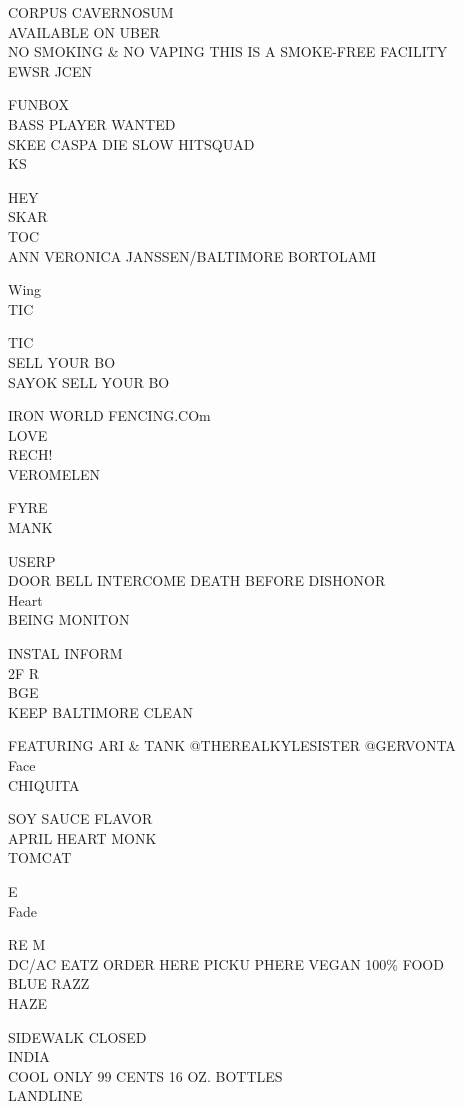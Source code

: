 \documentclass[10pt,letterpaper]{article}
\begin{document}
CORPUS CAVERNOSUM\\
AVAILABLE ON UBER\\
NO SMOKING \& NO VAPING THIS IS A SMOKE{-}FREE FACILITY\\
EWSR JCEN

FUNBOX\\
BASS PLAYER WANTED\\
SKEE CASPA DIE SLOW HITSQUAD\\
KS

HEY\\
SKAR\\
TOC\\
ANN VERONICA JANSSEN/BALTIMORE BORTOLAMI

Wing\\
TIC

TIC\\
SELL YOUR BO\\
SAYOK SELL YOUR BO

IRON WORLD FENCING.COm\\
LOVE\\
RECH!\\
VEROMELEN

FYRE\\
MANK

USERP\\
DOOR BELL INTERCOME DEATH BEFORE DISHONOR\\
Heart\\
BEING MONITON

INSTAL INFORM\\
2F R\\
BGE\\
KEEP BALTIMORE CLEAN

FEATURING ARI \& TANK @THEREALKYLESISTER @GERVONTA\\
Face\\
CHIQUITA

SOY SAUCE FLAVOR\\
APRIL HEART MONK\\
TOMCAT

E\\
Fade

RE M\\
DC/AC EATZ ORDER HERE PICKU PHERE VEGAN 100\% FOOD\\
BLUE RAZZ\\
HAZE

SIDEWALK CLOSED\\
INDIA\\
COOL ONLY 99 CENTS 16 OZ. BOTTLES\\
LANDLINE
\end{document}
